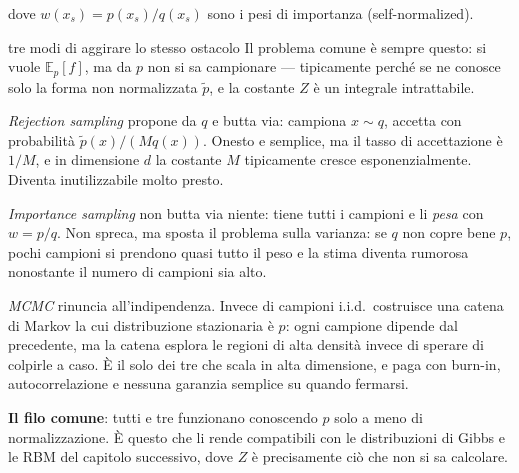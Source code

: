 dove $w(x_s) = p(x_s)/q(x_s)$ sono i pesi di importanza (self-normalized).

\begin{intuizione}{tre modi di aggirare lo stesso ostacolo}
Il problema comune è sempre questo: si vuole $\mathbb{E}_p[f]$, ma da $p$ non si sa campionare — tipicamente perché se ne conosce solo la forma non normalizzata $\tilde p$, e la costante $Z$ è un integrale intrattabile.

\emph{Rejection sampling} propone da $q$ e butta via: campiona $x \sim q$, accetta con probabilità $\tilde p(x)/(M q(x))$. Onesto e semplice, ma il tasso di accettazione è $1/M$, e in dimensione $d$ la costante $M$ tipicamente cresce esponenzialmente. Diventa inutilizzabile molto presto.

\emph{Importance sampling} non butta via niente: tiene tutti i campioni e li \emph{pesa} con $w = p/q$. Non spreca, ma sposta il problema sulla varianza: se $q$ non copre bene $p$, pochi campioni si prendono quasi tutto il peso e la stima diventa rumorosa nonostante il numero di campioni sia alto.

\emph{MCMC} rinuncia all'indipendenza. Invece di campioni i.i.d.\ costruisce una catena di Markov la cui distribuzione stazionaria è $p$: ogni campione dipende dal precedente, ma la catena esplora le regioni di alta densità invece di sperare di colpirle a caso. È il solo dei tre che scala in alta dimensione, e paga con burn-in, autocorrelazione e nessuna garanzia semplice su quando fermarsi.

\textbf{Il filo comune}: tutti e tre funzionano conoscendo $p$ solo a meno di normalizzazione. È questo che li rende compatibili con le distribuzioni di Gibbs e le RBM del capitolo successivo, dove $Z$ è precisamente ciò che non si sa calcolare.
\end{intuizione}

